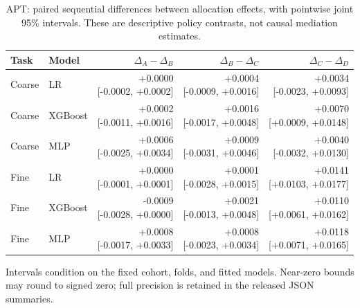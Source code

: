 \begin{table}[htbp]\centering\small
\setlength{\tabcolsep}{5pt}\renewcommand{\arraystretch}{1.2}
\caption{APT: paired sequential differences between allocation effects, with pointwise joint 95\% intervals. These are descriptive policy contrasts, not causal mediation estimates.}
\begin{tabular}{llrrr}\toprule
Task & Model & $\Delta_A-\Delta_B$ & $\Delta_B-\Delta_C$ & $\Delta_C-\Delta_D$ \\\midrule
Coarse & LR & \makecell{+0.0000\\{[-0.0002, +0.0002]}} & \makecell{+0.0004\\{[-0.0009, +0.0016]}} & \makecell{+0.0034\\{[-0.0023, +0.0093]}} \\
Coarse & XGBoost & \makecell{+0.0002\\{[-0.0011, +0.0016]}} & \makecell{+0.0016\\{[-0.0017, +0.0048]}} & \makecell{+0.0070\\{[+0.0009, +0.0148]}} \\
Coarse & MLP & \makecell{+0.0006\\{[-0.0025, +0.0034]}} & \makecell{+0.0009\\{[-0.0031, +0.0046]}} & \makecell{+0.0040\\{[-0.0032, +0.0130]}} \\
Fine & LR & \makecell{+0.0000\\{[-0.0001, +0.0001]}} & \makecell{+0.0001\\{[-0.0028, +0.0015]}} & \makecell{+0.0141\\{[+0.0103, +0.0177]}} \\
Fine & XGBoost & \makecell{-0.0009\\{[-0.0028, +0.0000]}} & \makecell{+0.0021\\{[-0.0013, +0.0048]}} & \makecell{+0.0110\\{[+0.0061, +0.0162]}} \\
Fine & MLP & \makecell{+0.0008\\{[-0.0017, +0.0033]}} & \makecell{+0.0008\\{[-0.0023, +0.0034]}} & \makecell{+0.0118\\{[+0.0071, +0.0165]}} \\
\bottomrule\end{tabular}\end{table}
Intervals condition on the fixed cohort, folds, and fitted models. Near-zero bounds may round to signed zero; full precision is retained in the released JSON summaries.
\clearpage
